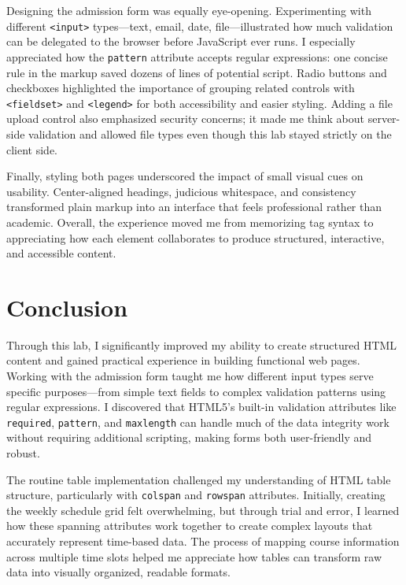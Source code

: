 \documentclass[twoside]{article}
\begin{document}
Designing the admission form was equally eye-opening. Experimenting with different \texttt{<input>} types—text, email, date, file—illustrated how much validation can be delegated to the browser before JavaScript ever runs. I especially appreciated how the \texttt{pattern} attribute accepts regular expressions: one concise rule in the markup saved dozens of lines of potential script. Radio buttons and checkboxes highlighted the importance of grouping related controls with \texttt{<fieldset>} and \texttt{<legend>} for both accessibility and easier styling. Adding a file upload control also emphasized security concerns; it made me think about server-side validation and allowed file types even though this lab stayed strictly on the client side.

Finally, styling both pages underscored the impact of small visual cues on usability. Center-aligned headings, judicious whitespace, and consistency transformed plain markup into an interface that feels professional rather than academic. Overall, the experience moved me from memorizing tag syntax to appreciating how each element collaborates to produce structured, interactive, and accessible content.

\section{Conclusion}

Through this lab, I significantly improved my ability to create structured HTML content and gained practical experience in building functional web pages. Working with the admission form taught me how different input types serve specific purposes—from simple text fields to complex validation patterns using regular expressions. I discovered that HTML5's built-in validation attributes like \texttt{required}, \texttt{pattern}, and \texttt{maxlength} can handle much of the data integrity work without requiring additional scripting, making forms both user-friendly and robust.

The routine table implementation challenged my understanding of HTML table structure, particularly with \texttt{colspan} and \texttt{rowspan} attributes. Initially, creating the weekly schedule grid felt overwhelming, but through trial and error, I learned how these spanning attributes work together to create complex layouts that accurately represent time-based data. The process of mapping course information across multiple time slots helped me appreciate how tables can transform raw data into visually organized, readable formats.
\end{document}
